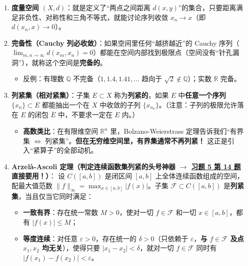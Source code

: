 \documentclass[11pt,a4paper]{article}
\providecommand{\tightlist}{\setlength{\itemsep}{2pt}\setlength{\parskip}{0pt}}
\begin{document}
\begin{enumerate}
\def\labelenumi{\arabic{enumi}.}
\tightlist
\item
  \textbf{度量空间 \((X, d)\)}：就是定义了``两点之间距离 \(d(x, y)\)''的集合，只要距离满足非负性、对称性和三角不等式，就能讨论序列收敛 \(x_n \to x\)（即 \(d(x_n, x) \to 0\)）。
\item
  \textbf{完备性（Cauchy 列必收敛）}：如果空间里任何``越挤越近''的 Cauchy 序列（\(\lim_{m,n\to\infty} d(x_m, x_n) = 0\)）都能在空间内部找到极限点（空间没有``针孔漏洞''），就称这个空间是\textbf{完备的}。

  \begin{itemize}
  \tightlist
  \item
    反例：有理数 \(\mathbb{Q}\) 不完备（\(1, 1.4, 1.41, \dots\) 趋向于 \(\sqrt{2} \notin \mathbb{Q}\)）；实数 \(\mathbb{R}\) 完备。
  \end{itemize}
\item
  \textbf{列紧集（相对紧集）}：子集 \(E \subset X\) 称为\textbf{列紧的}，如果 \(E\) 中\textbf{任意一个序列} \(\{x_n\} \subset E\) 都能抽出一个在 \(X\) 中收敛的子列 \(\{x_{n_k}\}\)。（注意：子列的极限允许落在 \(E\) 的闭包 \(\overline{E}\) 中，不要求一定在 \(E\) 内。）

  \begin{itemize}
  \tightlist
  \item
    \textbf{高数类比}：在有限维空间 \(\mathbb{R}^n\) 里，Bolzano-Weierstrass 定理告诉我们``有界集 \(\iff\) 列紧集''。\textbf{但在无穷维空间里，有界集通常不再列紧！} 这正是引入``紧算子''的全部动机。
  \end{itemize}
\item
  \textbf{Arzelà-Ascoli 定理（判定连续函数集列紧的头号神器 \(\to\) \hyperlink{prob:5-14}{\textcolor{LinkColor}{习题 5 第 14 题}}直接要用！）}： 设 \(C([a, b])\) 是闭区间 \([a, b]\) 上全体连续函数组成的空间，配最大值范数 \(\|f\|_\infty = \max_{x \in [a, b]} |f(x)|\)。子集 \(\mathcal{F} \subset C([a, b])\) 是\textbf{列紧集}，当且仅当它同时满足：

  \begin{itemize}
  \tightlist
  \item
    \textbf{一致有界}：存在统一常数 \(M > 0\)，使对一切 \(f \in \mathcal{F}\) 和一切 \(x \in [a, b]\)，都有 \(|f(x)| \le M\)；
  \item
    \textbf{等度连续}：对任意 \(\varepsilon > 0\)，存在统一的 \(\delta > 0\)（只依赖于 \(\varepsilon\)，\textbf{与 \(f \in \mathcal{F}\) 及点 \(x_1, x_2\) 均无关}），使得只要 \(|x_1 - x_2| < \delta\)，就对一切 \(f \in \mathcal{F}\) 同时有 \(|f(x_1) - f(x_2)| < \varepsilon\)。
  \end{itemize}
\end{enumerate}
\end{document}
